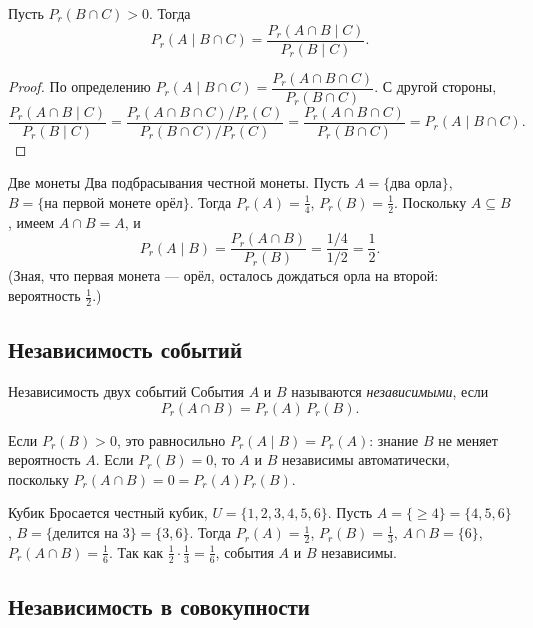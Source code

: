 \begin{Statement}{}{}
	Пусть \(P_r(B\cap C)>0\). Тогда
	\[
	P_r(A\mid B\cap C)=\frac{P_r(A\cap B\mid C)}{P_r(B\mid C)}.
	\]
\end{Statement}

\begin{proof}
	По определению $P_r(A\mid B\cap C)=\dfrac{P_r(A\cap B\cap C)}{P_r(B\cap C)}$. С другой стороны,
	\[
	\frac{P_r(A\cap B\mid C)}{P_r(B\mid C)}
	=\frac{P_r(A\cap B\cap C)/P_r(C)}{P_r(B\cap C)/P_r(C)}
	=\frac{P_r(A\cap B\cap C)}{P_r(B\cap C)}
	=P_r(A\mid B\cap C).
	\]
\end{proof}

\begin{Example}{Две монеты}{}
	Два подбрасывания честной монеты. Пусть $A=\{\text{два орла}\}$, $B=\{\text{на первой монете орёл}\}$. Тогда $P_r(A)=\tfrac14$, $P_r(B)=\tfrac12$. Поскольку $A\subseteq B$, имеем $A\cap B=A$, и
	\[
	P_r(A\mid B)=\frac{P_r(A\cap B)}{P_r(B)}=\frac{1/4}{1/2}=\frac12.
	\]
	(Зная, что первая монета — орёл, осталось дождаться орла на второй: вероятность $\tfrac12$.)
\end{Example}

\subsection{Независимость событий}

\begin{Definition}{Независимость двух событий}{}
	События \(A\) и \(B\) называются \textit{независимыми}, если
	\[
	P_r(A\cap B)=P_r(A)\,P_r(B).
	\]
\end{Definition}

\begin{Remark}{}{}
	Если $P_r(B)>0$, это равносильно $P_r(A\mid B)=P_r(A)$: знание $B$ не меняет вероятность $A$. Если $P_r(B)=0$, то $A$ и $B$ независимы автоматически, поскольку $P_r(A\cap B)=0=P_r(A)P_r(B)$.
\end{Remark}

\begin{Example}{Кубик}{}
	Бросается честный кубик, $U=\{1,2,3,4,5,6\}$. Пусть $A=\{\ge 4\}=\{4,5,6\}$, $B=\{\text{делится на }3\}=\{3,6\}$. Тогда $P_r(A)=\tfrac12$, $P_r(B)=\tfrac13$, $A\cap B=\{6\}$, $P_r(A\cap B)=\tfrac16$. Так как $\tfrac12\cdot\tfrac13=\tfrac16$, события \(A\) и \(B\) независимы.
\end{Example}

\subsection{Независимость в совокупности}

